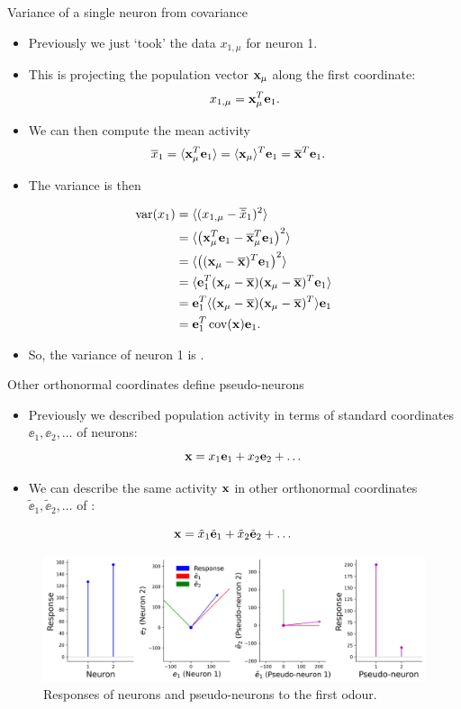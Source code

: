 \documentclass[presentation,smaller]{beamer}
\begin{document}
\begin{frame}[label={sec:org7fd38da}]{Variance of a single neuron from covariance}
\begin{itemize}
\item Previously we just `took' the data \(x_{1,\mu}\)  for neuron 1.
\item This is projecting the population vector \(\mathbf{x}_\mu\) along the first coordinate: $$x_{1,\mu} = \mathbf{x}_\mu^T \mathbf e_1.$$
\item We can then compute the mean activity
\begin{align*}
\overline{x}_1 &= \langle \mathbf{x}_\mu^T \mathbf e_1 \rangle = \langle \mathbf{x}_\mu \rangle^T \mathbf e_1 = \overline{\mathbf{x}}^T  \mathbf e_1.
\end{align*}
\item The variance is then
\end{itemize}
\begin{align*}
 \operatorname{var}(x_1) &= \langle (x_{1,\mu}- \overline{\tilde x}_1)^2 \rangle \\
&= \langle \left( \mathbf{x}_\mu^T \mathbf e_1  - \overline{\mathbf{x}}_\mu^T \mathbf e_1 \right)^2 \rangle\\
&= \langle \left( (\mathbf{x}_\mu - \overline{\mathbf{x}})^T\mathbf e_1 \right)^2 \rangle\\
&= \langle \mathbf e_1^T(\mathbf{x}_\mu - \overline{\mathbf{x}})  (\mathbf{x}_\mu - \overline{\mathbf{x}})^T\mathbf e_1  \rangle\\
&= \mathbf e_1^T \langle (\mathbf{x}_\mu - \overline{\mathbf{x}}) (\mathbf{x}_\mu - \overline{\mathbf{x}})^T \rangle \mathbf e_1\\
&= \mathbf e_1^T \operatorname{cov}(\mathbf{x}) \mathbf e_1.
\end{align*}
\begin{itemize}
\item So, the variance of neuron 1 is .
\end{itemize}
\end{frame}
\begin{frame}[label={sec:org34f6646}]{Other orthonormal coordinates define pseudo-neurons}
\begin{itemize}
\item Previously we described population activity in terms of standard coordinates \(\ee_1, \ee_2, \dots\) of neurons:
$$ \mathbf{x} = x_1 \mathbf e_1 + x_2 \mathbf e_2 + \dots $$
\item We can describe the same activity \(\mathbf{x}\) in other orthonormal coordinates \(\tilde \ee_1, \tilde \ee_2, \dots\) of :
\end{itemize}
$$ \mathbf{x} = \tilde x_1 \tilde {\mathbf e}_1 + \tilde x_2 \tilde {\mathbf e}_2 + \dots $$
\begin{figure}[htbp]
\centering
\includegraphics[width=1.0\textwidth]{figures/coordinate_transform.png}
\caption{Responses of neurons and pseudo-neurons to the first odour.}
\end{figure}
\end{frame}
\end{document}
